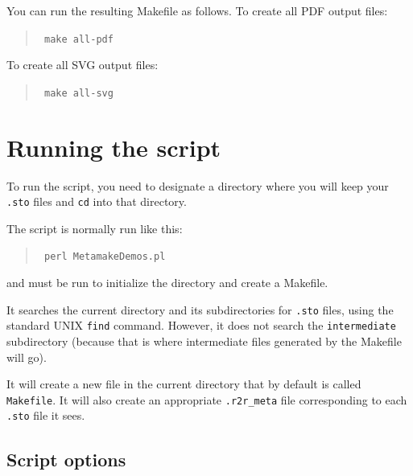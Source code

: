 \documentclass[letterpaper,12pt]{report}
\newcommand{\example}[1]{
\begin{quote}
{\raggedright
#1
}
\end{quote}
}
\newcommand{\examplett}[1]{
\example{{\tt #1}}
}
\begin{document}
You can run the resulting Makefile as follows.  To create all PDF output files:
\examplett{
make all-pdf
}
To create all SVG output files:
\examplett{
make all-svg
}

\section{Running the script}

To run the script, you need to designate a directory where you will keep your {\tt .sto} files and {\tt cd} into that directory.

The script is normally run like this:
\examplett{
perl MetamakeDemos.pl
}
and must be run to initialize the directory and create a Makefile.

It searches the current directory and its subdirectories for {\tt .sto} files, using the standard
UNIX {\tt find} command.
However, it does not search the {\tt intermediate} subdirectory (because that is where intermediate files generated by the Makefile will go).

It will create a new file in the current directory that by default is called  {\tt Makefile}.
It will also create an appropriate {\tt .r2r\_meta} file corresponding to each {\tt .sto} file it sees.

\subsection{Script options}
\label{sec:Makefile:perloptions}
\end{document}
